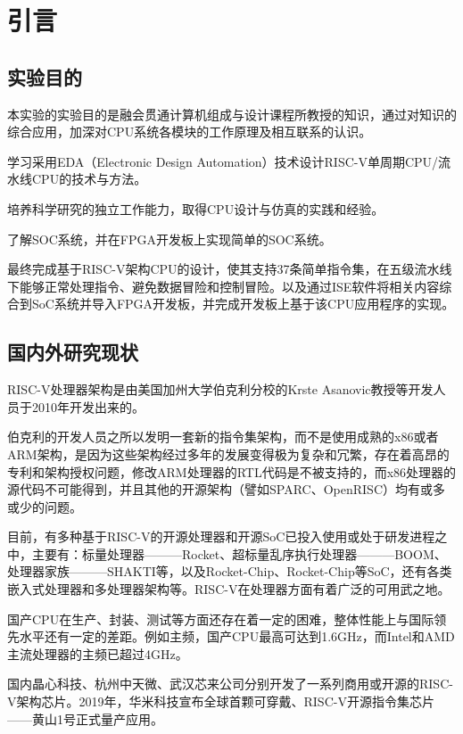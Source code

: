\documentclass[UTF8,a4paper,autofakebold,15pt]{ctexart}
\begin{document}
\section{引言}

\subsection{实验目的}

	本实验的实验目的是融会贯通计算机组成与设计课程所教授的知识，通过对知识的综合应用，加深对CPU系统各模块的工作原理及相互联系的认识。
	
	学习采用EDA（Electronic Design Automation）技术设计RISC-V单周期CPU/流水线CPU的技术与方法。
	
	培养科学研究的独立工作能力，取得CPU设计与仿真的实践和经验。
	
	了解SOC系统，并在FPGA开发板上实现简单的SOC系统。
	
	最终完成基于RISC-V架构CPU的设计，使其支持37条简单指令集，在五级流水线下能够正常处理指令、避免数据冒险和控制冒险。以及通过ISE软件将相关内容综合到SoC系统并导入FPGA开发板，并完成开发板上基于该CPU应用程序的实现。

\subsection{国内外研究现状}


	RISC-V处理器架构是由美国加州大学伯克利分校的Krste Asanovic教授等开发人员于2010年开发出来的。
	
	伯克利的开发人员之所以发明一套新的指令集架构，而不是使用成熟的x86或者ARM架构，是因为这些架构经过多年的发展变得极为复杂和冗繁，存在着高昂的专利和架构授权问题，修改ARM处理器的RTL代码是不被支持的，而x86处理器的源代码不可能得到，并且其他的开源架构（譬如SPARC、OpenRISC）均有或多或少的问题。\cite{ref3}
	
	目前，有多种基于RISC-V的开源处理器和开源SoC已投入使用或处于研发进程之中，主要有：标量处理器———Rocket、超标量乱序执行处理器———BOOM、处理器家族———SHAKTI等，以及Rocket-Chip、Rocket-Chip等SoC\cite{ref5}，还有各类嵌入式处理器和多处理器架构等。RISC-V在处理器方面有着广泛的可用武之地。
	
	国产CPU在生产、封装、测试等方面还存在着一定的困难，整体性能上与国际领先水平还有一定的差距。例如主频，国产CPU最高可达到1.6GHz，而Intel和AMD主流处理器的主频已超过4GHz。\cite{ref2}
	
	国内晶心科技、杭州中天微、武汉芯来公司分别开发了一系列商用或开源的RISC-V架构芯片。2019年，华米科技宣布全球首颗可穿戴、RISC-V开源指令集芯片——黄山1号正式量产应用。\cite{ref4}
	
\end{document}
